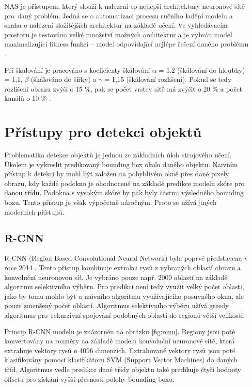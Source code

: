 NAS je přístupem, který slouží k nalezení co nejlepší architektury neuronové sítě pro~daný problém. Jedná se o automatizaci procesu ručního ladění modelu a snahu o nalezení složitějších architektur na základě učení. Ve vyhledávacím prostoru je testováno velké množství možných architektur a je vybrán model maximalizující fitness funkci -- model odpovídající nejlépe řešení daného problému \cite{NAS}.

Při škálování je pracováno s koeficienty škálování $\alpha$ = 1,2 (škálování do hloubky) = 1,1, $\beta$ (škálováno do šířky) a $\gamma$ = 1,15 (škálování rozlišení). Pokud se tedy rozlišení obrazu zvýší o 15 \%, pak se počet vrstev sítě má zvýšit o 20 \% a počet kanálů o 10 \% \cite{EfficientNet, EfficientNetBlog}.


\section{Přístupy pro detekci objektů}
\label{sec:detekce}
Problematika detekce objektů je jednou ze základních úloh strojového učení. Úkolem je vykreslit predikovaný bounding box okolo daného objektu. Naivním přístup k detekci by mohl být založen na pohyblivém okně přes dané pixely obrazu, kdy každé podokno je ohodnocené na základě predikce modelu skóre pro danou třídu. Podokna s vysokým skóre by pak byly částmi výsledného bounding boxu. Tento přístup je však výpočetně náročným. Proto se užívá jiných moderních přístupů. 
\subsection{R-CNN}
R-CNN (Region Based Convolutional Neural Network) byla poprvé představena v roce 2014 \cite{RCNN}. Tento přístup kombinuje extrakci rysů z vybraných oblastí obrazu a konvoluční neuronovou síť. Je vybráno pouze např. 2000 oblastí na základě algoritmu selektivního výběru. Pro predikci není tedy využit velký počet oblastí, jako by tomu mohlo být u naivního algoritmu využívajícího posuvného okna, ale pouze zmenšený počet oblastí. Algoritmus selektivního výběru užívá greedy algoritmus pro~rekurzivní spojování podobných oblastí do regionů větší velikosti. 

Princip R-CNN modelu je znázorněn na obrázku \ref{fig:rcnn}. Regiony jsou poté konvertovány na rozměry na základě modelu konvoluční neuronové sítě, která extrahuje vektory rysů o 4096 dimenzích. Extrahované vektory rysů jsou poté klasifikovány pomocí klasifikátoru SVM (Support Vector Machines) do daných tříd. Algoritmus vedle predikce dané třídy objektu také predikuje čtyři hodnoty offsetu pro získání vyšší přesnosti polohy bounding boxu.

